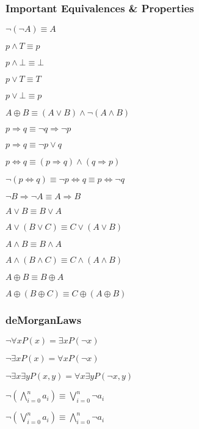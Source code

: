\documentclass[5pt]{article}
\begin{document}
\begin{multicols}{2}
\subsubsection{Important Equivalences \& Properties}
\begin{itemize*}
    \item $\lnot(\lnot A)\equiv A$
    \item $p\land T\equiv p$
    \item $p\land\bot\equiv\bot$
    \item $p\lor T\equiv T$
    \item $p\lor\bot\equiv p$
    \item $A\oplus B\equiv (A\lor B)\land\lnot(A\land B)$
    \item $p\Rightarrow q\equiv \lnot q\Rightarrow \lnot p$
    \item $p\Rightarrow q\equiv \lnot p \lor q$
    \item $p\Leftrightarrow q\equiv (p\Rightarrow q)\land(q\Rightarrow p)$
    \item $\lnot (p\Leftrightarrow q)\equiv \lnot p \Leftrightarrow q\equiv p \Leftrightarrow \lnot q$
    \item $\lnot B\Rightarrow \lnot A \equiv A\Rightarrow B$
\end{itemize*}

\begin{properties}
    \begin{itemize*}
        \item $A\lor B\equiv B\lor A$
        \item $A\lor (B\lor C)\equiv C\lor (A\lor B)$
        \item $A\land B\equiv B\land A$
        \item $A\land(B\land C)\equiv C\land (A\land B)$
        \item $A\oplus B\equiv B\oplus A$
        \item $A\oplus(B\oplus C)\equiv C\oplus (A\oplus B)$
    \end{itemize*}
\end{properties}

\subsubsection{deMorganLaws}
\begin{itemize*}
    \item $\lnot\forall xP(x)=\exists xP(\lnot x)$
    \item $\lnot\exists xP(x)=\forall xP(\lnot x)$
    \item $\lnot\exists x\exists yP(x,y)=\forall x\exists yP(\lnot x,y)$
    \item $\lnot\left(\bigwedge_{i=0}^na_i\right)\equiv\bigvee_{i=0}^n\lnot a_i$
    \item $\lnot\left(\bigvee_{i=0}^na_i\right)\equiv\bigwedge_{i=0}^n\lnot a_i$
\end{itemize*}



\end{multicols}
\end{document}
